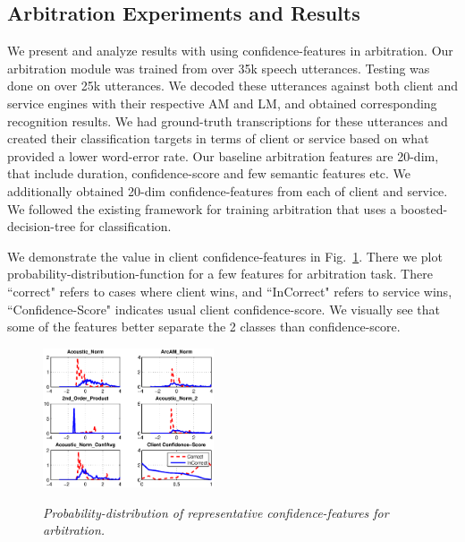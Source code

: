 
\subsection{Arbitration Experiments and Results}\label{Sec:ArbitrationResults}
We present and analyze results with using confidence-features in arbitration.
Our arbitration module was trained from over 35k speech utterances. Testing was done on over 25k utterances. We decoded these utterances against both client and service engines with their respective  AM and LM, and obtained corresponding recognition results. We had ground-truth transcriptions for these utterances and created their classification targets in terms of client or service based on what provided a lower word-error rate. Our baseline arbitration features are 20-dim, that include duration, confidence-score and few semantic features etc. We additionally obtained 20-dim confidence-features from each of client and service. We followed the existing framework for training arbitration that uses a boosted-decision-tree for classification.




We demonstrate the value in client confidence-features in Fig.~\ref{Fig:PhrasePreds-Hist}. There we plot probability-distribution-function for a few features for arbitration task. There ``correct" refers to cases where client wins, and ``InCorrect" refers to service wins, ``Confidence-Score" indicates usual client confidence-score. We visually see that some of the features better separate the 2 classes than confidence-score.

\begin{figure}[h]
\centering
{\includegraphics[width=0.45\textwidth]{PhrasePreds-Hist.eps}}
\caption{\it Probability-distribution of representative confidence-features for arbitration.}
\label{Fig:PhrasePreds-Hist}
\end{figure}

